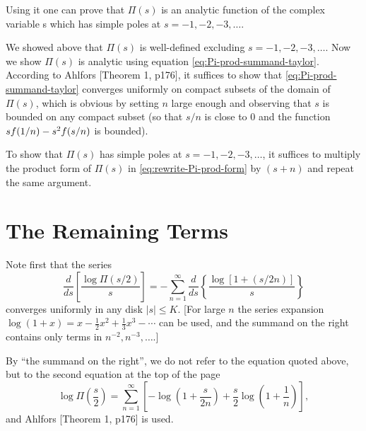 \documentclass{note}
\numberwithin{equation}{chapter}
\begin{document}
\begin{quotebar}
    Using it one can prove that $\Pi(s)$ is an analytic function of the complex
    variable s which has simple poles at $s = -1, -2, -3, \dots$.
\end{quotebar}

We showed above that $\Pi(s)$ is well-defined excluding $s = -1, -2, -3,
    \dots$. Now we show $\Pi(s)$ is analytic using equation
\eqref{eq:Pi-prod-summand-taylor}. According to Ahlfors [Theorem 1, p176], it
suffices to show that \eqref{eq:Pi-prod-summand-taylor} converges uniformly on
compact subsets of the domain of $\Pi(s)$, which is obvious by setting $n$
large enough and observing that $s$ is bounded on any compact subset (so that
$s/n$ is close to $0$ and the function $s f\prn{1/n} - s^2 f\prn{s/n}$ is
bounded).

To show that $\Pi(s)$ has simple poles at $s = -1, -2, -3, \dots$, it suffices
to multiply the product form of $\Pi(s)$ in \eqref{eq:rewrite-Pi-prod-form} by
$(s+n)$ and repeat the same argument.

\setcounter{section}{15}
\section{The Remaining Terms}


\begin{quotebar}
    Note first that the series
    \[
        \frac{d}{ds} \left[ \frac{\log \Pi(s/2)}{s} \right] = -\sum_{n=1}^\infty
        \frac{d}{ds} \left\{ \frac{\log[1 + (s/2n)]}{s} \right\}
    \]
    converges uniformly in any disk $|s| \leq K$. [For large $n$ the series
            expansion $\log(1 + x) = x - \frac{1}{2}x^2 + \frac{1}{3}x^3 - \cdots$ can be
            used, and the summand on the right contains only terms in $n^{-2}, n^{-3},
                \ldots.$]
\end{quotebar}

By ``the summand on the right'', we do not refer to the equation quoted above,
but to the second equation at the top of the page
\[
    \log \Pi\left(\frac{s}{2}\right) = \sum_{n=1}^\infty \left[ -\log\left(1 +
        \frac{s}{2n}\right) + \frac{s}{2} \log\left(1 + \frac{1}{n}\right)
        \right],
\]
and Ahlfors [Theorem 1, p176] is used.

\end{document}
